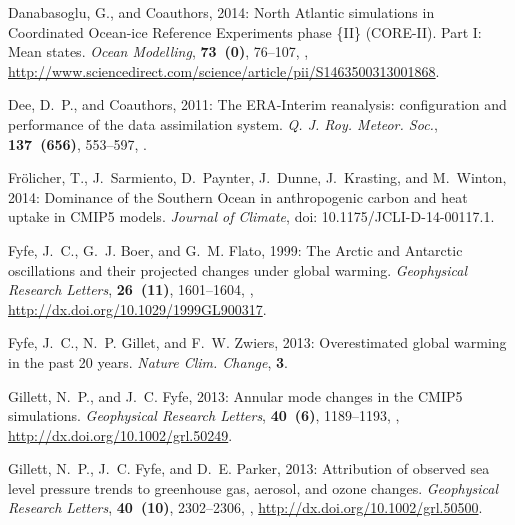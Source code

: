 \documentclass{ametsoc}
\begin{document}
\begin{thebibliography}{53}
Danabasoglu, G., and Coauthors, 2014: {North Atlantic simulations in
  Coordinated Ocean-ice Reference Experiments phase \{II\} (CORE-II). Part I:
  Mean states}. \textit{Ocean Modelling}, \textbf{73~(0)}, 76--107,
  ,
  \urlprefix\url{http://www.sciencedirect.com/science/article/pii/S1463500313001868}.

Dee, D.~P., and Coauthors, 2011: {The {ERA-I}nterim reanalysis: configuration
  and performance of the data assimilation system}. \textit{Q. J. Roy. Meteor.
  Soc.}, \textbf{137~(656)}, 553--597, .

Fr{\"o}licher, T., J.~Sarmiento, D.~Paynter, J.~Dunne, J.~Krasting, and
  M.~Winton, 2014: {Dominance of the Southern Ocean in anthropogenic carbon and
  heat uptake in CMIP5 models}. \textit{Journal of Climate}, doi:
  10.1175/JCLI-D-14-00117.1.

Fyfe, J.~C., G.~J. Boer, and G.~M. Flato, 1999: {The Arctic and Antarctic
  oscillations and their projected changes under global warming}.
  \textit{Geophysical Research Letters}, \textbf{26~(11)}, 1601--1604,
  ,
  \urlprefix\url{http://dx.doi.org/10.1029/1999GL900317}.

Fyfe, J.~C., N.~P. Gillet, and F.~W. Zwiers, 2013: {Overestimated global
  warming in the past 20 years}. \textit{Nature Clim. Change}, \textbf{3}.

Gillett, N.~P., and J.~C. Fyfe, 2013: {Annular mode changes in the CMIP5
  simulations}. \textit{Geophysical Research Letters}, \textbf{40~(6)},
  1189--1193, ,
  \urlprefix\url{http://dx.doi.org/10.1002/grl.50249}.

Gillett, N.~P., J.~C. Fyfe, and D.~E. Parker, 2013: {Attribution of observed
  sea level pressure trends to greenhouse gas, aerosol, and ozone changes}.
  \textit{Geophysical Research Letters}, \textbf{40~(10)}, 2302--2306,
  , \urlprefix\url{http://dx.doi.org/10.1002/grl.50500}.


\end{thebibliography}
\end{document}
